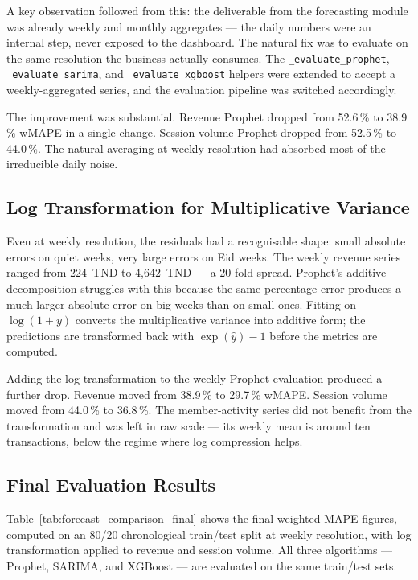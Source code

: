 A key observation followed from this: the deliverable from the forecasting
module was already weekly and monthly aggregates --- the daily numbers were
an internal step, never exposed to the dashboard. The natural fix was to
evaluate on the same resolution the business actually consumes. The
\texttt{\_evaluate\_prophet}, \texttt{\_evaluate\_sarima}, and
\texttt{\_evaluate\_xgboost} helpers were extended to accept a weekly-aggregated
series, and the evaluation pipeline was switched accordingly.

The improvement was substantial. Revenue Prophet dropped from 52.6\,\% to
38.9\,\% wMAPE in a single change. Session volume Prophet dropped from
52.5\,\% to 44.0\,\%. The natural averaging at weekly resolution had absorbed
most of the irreducible daily noise.

\subsection{Log Transformation for Multiplicative Variance}

Even at weekly resolution, the residuals had a recognisable shape: small
absolute errors on quiet weeks, very large errors on Eid weeks. The weekly
revenue series ranged from 224~TND to 4{,}642~TND --- a 20-fold spread.
Prophet's additive decomposition struggles with this because the same
percentage error produces a much larger absolute error on big weeks than
on small ones. Fitting on $\log(1+y)$ converts the multiplicative variance
into additive form; the predictions are transformed back with $\exp(\hat{y})-1$
before the metrics are computed.

Adding the log transformation to the weekly Prophet evaluation produced a
further drop. Revenue moved from 38.9\,\% to 29.7\,\% wMAPE. Session volume
moved from 44.0\,\% to 36.8\,\%. The member-activity series did not benefit
from the transformation and was left in raw scale --- its weekly mean is
around ten transactions, below the regime where log compression helps.

\subsection{Final Evaluation Results}

Table~\ref{tab:forecast_comparison_final} shows the final weighted-MAPE
figures, computed on an 80/20 chronological train/test split at weekly
resolution, with log transformation applied to revenue and session volume.
All three algorithms --- Prophet, SARIMA, and XGBoost --- are evaluated on
the same train/test sets.

